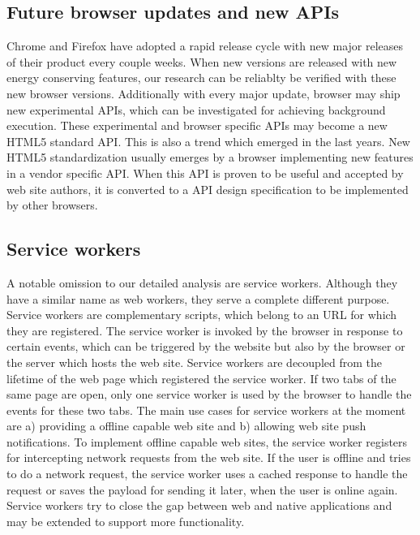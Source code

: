 \documentclass[
	ngerman,
	ruledheaders=section,%
	class=report,%
	thesis={type=bachelor},%
	accentcolor=9c,%
	custommargins=true,%
	marginpar=false,%
	parskip=half-,%
	fontsize=11pt,%
]{tudapub}
\begin{document}
  \subsection{Future browser updates and new APIs}

  Chrome and Firefox have adopted a rapid release cycle with new major releases of their product every couple weeks. When new versions are released with new energy conserving features, our research can be reliablty be verified with these new browser versions. Additionally with every major update, browser may ship new experimental APIs, which can be investigated for achieving background execution. These experimental and browser specific APIs may become a new HTML5 standard API. This is also a trend which emerged in the last years. New HTML5 standardization usually emerges by a browser implementing new features in a vendor specific API. When this API is proven to be useful and accepted by web site authors, it is converted to a API design specification to be implemented by other browsers.
  
  \subsection{Service workers}

  A notable omission to our detailed analysis are service workers. Although they have a similar name as web workers, they serve a complete different purpose. Service workers are complementary scripts, which belong to an URL for which they are registered. The service worker is invoked by the browser in response to certain events, which can be triggered by the website but also by the browser or the server which hosts the web site. Service workers are decoupled from the lifetime of the web page which registered the service worker. If two tabs of the same page are open, only one service worker is used by the browser to handle the events for these two tabs. The main use cases for service workers at the moment are a) providing a offline capable web site and b) allowing web site push notifications. To implement offline capable web sites, the service worker registers for intercepting network requests from the web site. If the user is offline and tries to do a network request, the service worker uses a cached response to handle the request or saves the payload for sending it later, when the user is online again. Service workers try to close the gap between web and native applications and may be extended to support more functionality.
\end{document}
